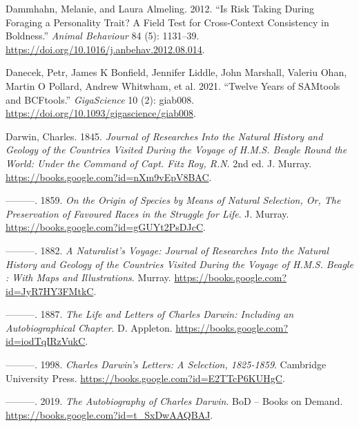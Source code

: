 \documentclass[
]{book}
\newlength{\cslhangindent}
\newlength{\cslentryspacingunit} %
\newenvironment{CSLReferences}[2] %
 {%
  \setlength{\parindent}{0pt}
  \ifodd #1
  \let\oldpar\par
  \def\par{\hangindent=\cslhangindent\oldpar}
  \fi
  \setlength{\parskip}{#2\cslentryspacingunit}
 }%
 {}
\begin{document}
\begin{CSLReferences}{1}{0}
\leavevmode{}%
Dammhahn, Melanie, and Laura Almeling. 2012. {``Is Risk Taking During Foraging a Personality Trait? {A} Field Test for Cross-Context Consistency in Boldness.''} \emph{Animal Behaviour} 84 (5): 1131--39. \url{https://doi.org/10.1016/j.anbehav.2012.08.014}.

\leavevmode{}%
Danecek, Petr, James K Bonfield, Jennifer Liddle, John Marshall, Valeriu Ohan, Martin O Pollard, Andrew Whitwham, et al. 2021. {``Twelve Years of {SAMtools} and {BCFtools}.''} \emph{GigaScience} 10 (2): giab008. \url{https://doi.org/10.1093/gigascience/giab008}.

\leavevmode{}%
Darwin, Charles. 1845. \emph{Journal of {Researches Into} the {Natural History} and {Geology} of the {Countries Visited During} the {Voyage} of {H}.{M}.{S}. {Beagle Round} the {World}: {Under} the {Command} of {Capt}. {Fitz Roy}, {R}.{N}}. 2nd ed. {J. Murray}. \url{https://books.google.com?id=nXm9vEpV8BAC}.

\leavevmode{}%
---------. 1859. \emph{On the {Origin} of {Species} by {Means} of {Natural Selection}, {Or}, {The Preservation} of {Favoured Races} in the {Struggle} for {Life}}. {J. Murray}. \url{https://books.google.com?id=gGUYt2PsDJcC}.

\leavevmode{}%
---------. 1882. \emph{A {Naturalist}'s {Voyage}: {Journal} of {Researches Into} the {Natural History} and {Geology} of the {Countries Visited During} the {Voyage} of {H}.{M}.{S}. {Beagle} : With {Maps} and {Illustrations}}. {Murray}. \url{https://books.google.com?id=JyR7HY3FMtkC}.

\leavevmode{}%
---------. 1887. \emph{The {Life} and {Letters} of {Charles Darwin}: {Including} an {Autobiographical Chapter}}. {D. Appleton}. \url{https://books.google.com?id=iodTqIRzVukC}.

\leavevmode{}%
---------. 1998. \emph{Charles {Darwin}'s {Letters}: {A Selection}, 1825-1859}. {Cambridge University Press}. \url{https://books.google.com?id=E2TTcP6KUHgC}.

\leavevmode{}%
---------. 2019. \emph{The {Autobiography} of {Charles Darwin}}. {BoD -- Books on Demand}. \url{https://books.google.com?id=t_SxDwAAQBAJ}.


\end{CSLReferences}
\end{document}
